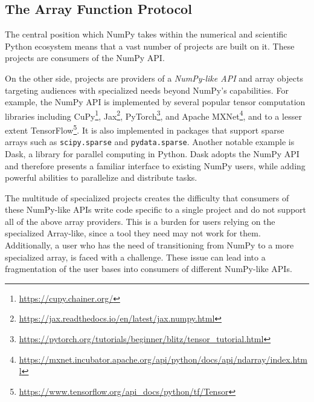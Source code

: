 \documentclass[fleqn,10pt]{wlscirep}
\newcommand{\code}[1]{\texttt{#1}}
\begin{document}
\subsection*{The Array Function Protocol}

The central position which NumPy takes within the numerical and scientific
Python ecosystem  means that a vast number of projects are built on it.
These projects are consumers of the NumPy API.

On the other side, projects are providers of a \emph{NumPy-like API} and array
objects targeting audiences with specialized needs beyond NumPy's capabilities.
For example, the NumPy API is implemented by
several popular tensor computation libraries including
CuPy\footnote{\url{https://cupy.chainer.org/}},
Jax\footnote{\url{https://jax.readthedocs.io/en/latest/jax.numpy.html}},
PyTorch\footnote{\url{https://pytorch.org/tutorials/beginner/blitz/tensor\_tutorial.html}}, and
Apache MXNet\footnote{\url{https://mxnet.incubator.apache.org/api/python/docs/api/ndarray/index.html}},
and to a lesser extent
TensorFlow\footnote{\url{https://www.tensorflow.org/api\_docs/python/tf/Tensor}}.
It is also implemented in packages that support sparse arrays
such as \code{scipy.sparse} and \code{pydata.sparse}.
Another notable example is Dask, a library for parallel computing in
Python.  Dask adopts the NumPy API and therefore presents a familiar
interface to existing NumPy users, while adding powerful abilities to
parallelize and distribute tasks.

The multitude of specialized projects creates the difficulty that consumers
of these NumPy-like APIs write code specific to a single project and do not support
all of the above array providers.
This is a burden for users relying on the specialized Array-like, since
a tool they need may not work for them.
Additionally, a user who has the need of transitioning from NumPy to a more
specialized array, is faced with a challenge.
These issue can lead into a fragmentation of the user bases into consumers
of different NumPy-like APIs.
\end{document}
